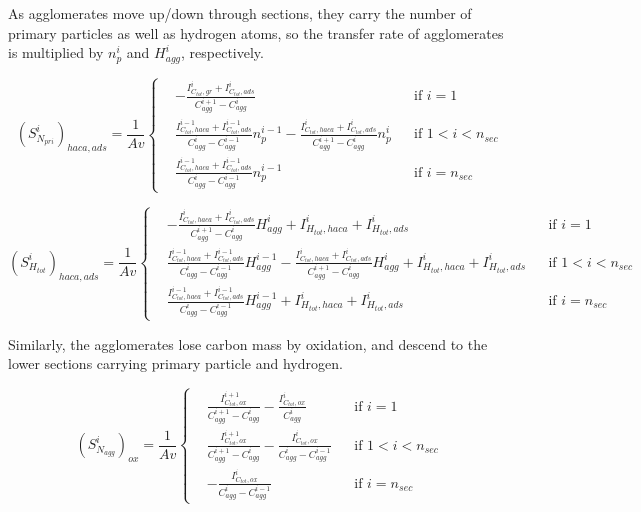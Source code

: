 As agglomerates move up/down through sections, they carry the number of primary particles as well as hydrogen atoms, so the transfer rate of agglomerates is multiplied by ${n^i_p}$ and ${H^i_{agg}}$, respectively. 

\begin{equation}
	\left(S^i_{N_{pri}}\right)_{haca, ads}=
	\frac{1}{Av}
	\left\{
	\begin{aligned}
		&-\frac{I^i_{C_{tot},gr}+I^i_{C_{tot},ads}}{C^{i+1}_{agg}-C^{i}_{agg}}
		&&
		\text{if } i = 1
		\\
		&\frac{I^{i-1}_{C_{tot},haca}+I^{i-1}_{C_{tot},ads}}{C^{i}_{agg}-C^{i-1}_{agg}}n^{i-1}_p
		-\frac{I^{i}_{C_{tot},haca}+I^{i}_{C_{tot},ads}}{C^{i+1}_{agg}-C^{i}_{agg}}n^{i}_p
		&&
		\text{if } 1 < i < n_{sec}
		\\
		&\frac{I^{i-1}_{C_{tot},haca}+I^{i-1}_{C_{tot},ads}}{C^{i}_{agg}-C^{i-1}_{agg}}n^{i-1}_p
		&&\text{if } i=n_{sec}
	\end{aligned}
	\right.
	\label{eqn:S_Npri_gradssect}
\end{equation}

\begin{equation}
	\left(S^i_{H_{tot}}\right)_{haca, ads}=
	\frac{1}{Av}
	\left\{
	\begin{aligned}
		&-\frac{I^i_{C_{tot},haca}+I^i_{C_{tot},ads}}{C^{i+1}_{agg}-C^{i}_{agg}}H^{i}_{agg} 
		+ I^{i}_{H_{tot}, haca} + I^{i}_{H_{tot}, ads}
		&&
		\text{if } i = 1
		\\
		&\frac{I^{i-1}_{C_{tot},haca}+I^{i-1}_{C_{tot},ads}}{C^{i}_{agg}-C^{i-1}_{agg}}H^{i-1}_{agg}
		-\frac{I^{i}_{C_{tot},haca}+I^{i}_{C_{tot},ads}}{C^{i+1}_{agg}-C^{i}_{agg}}H^{i}_{agg}
		+ I^{i}_{H_{tot}, haca} + I^{i}_{H_{tot}, ads}
		&&
		\text{if } 1 < i < n_{sec}
		\\
		&\frac{I^{i-1}_{C_{tot},haca}+I^{i-1}_{C_{tot},ads}}{C^{i}_{agg}-C^{i-1}_{agg}}H^{i-1}_{agg}
		+ I^{i}_{H_{tot}, haca} + I^{i}_{H_{tot}, ads}
		&&\text{if } i=n_{sec}
	\end{aligned}
	\right.
	\label{eqn:S_Htot_gradssect}
\end{equation}

Similarly, the agglomerates lose carbon mass by oxidation, and descend to the lower sections carrying primary particle and hydrogen.

\begin{equation}
	\left(S^i_{N_{agg}}\right)_{ox}=
	\frac{1}{Av}
	\left\{
	\begin{aligned}
		&\frac{I^{i+1}_{C_{tot},ox}}{C^{i+1}_{agg}-C^{i}_{agg}}
		-
		\frac{I^{i}_{C_{tot},ox}}{C^{i}_{agg}}
		&&
		\text{if } i = 1
		\\
		&\frac{I^{i+1}_{C_{tot},ox}}{C^{i+1}_{agg}-C^{i}_{agg}}
		-
		\frac{I^{i}_{C_{tot},ox}}{C^{i}_{agg}-C^{i-1}_{agg}}
		&&
		\text{if } 1 < i < n_{sec}
		\\
		&
		-
		\frac{I^{i}_{C_{tot},ox}}{C^{i}_{agg}-C^{i-1}_{agg}}
		&&\text{if } i=n_{sec}
	\end{aligned}
	\right.
	\label{eqn:S_Nagg_oxsect}
\end{equation}

